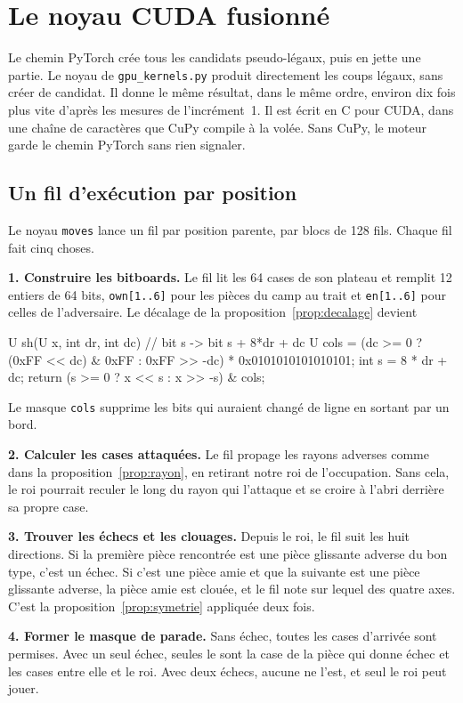 \documentclass[11pt,a4paper]{article}
\newcommand{\code}[1]{\texttt{#1}}
\theoremstyle{plain}
\begin{document}
\section{Le noyau CUDA fusionné}

Le chemin PyTorch crée tous les candidats pseudo-légaux, puis en jette une partie. Le noyau de
\code{gpu\_kernels.py} produit directement les coups légaux, sans créer de candidat. Il donne le
même résultat, dans le même ordre, environ dix fois plus vite d'après les mesures de
l'incrément~1. Il est écrit en C pour CUDA, dans une chaîne de caractères que CuPy compile à la
volée. Sans CuPy, le moteur garde le chemin PyTorch sans rien signaler.

\subsection{Un fil d'exécution par position}
Le noyau \code{moves} lance un fil par position parente, par blocs de 128 fils. Chaque fil fait
cinq choses.

\textbf{1. Construire les bitboards.} Le fil lit les 64 cases de son plateau et remplit 12
entiers de 64 bits, \code{own[1..6]} pour les pièces du camp au trait et \code{en[1..6]} pour
celles de l'adversaire. Le décalage de la proposition~\ref{prop:decalage} devient
\begin{python}
U sh(U x, int dr, int dc) {     // bit s -> bit s + 8*dr + dc
    U cols = (dc >= 0 ? (0xFF << dc) & 0xFF : 0xFF >> -dc) * 0x0101010101010101;
    int s = 8 * dr + dc;
    return (s >= 0 ? x << s : x >> -s) & cols;
}
\end{python}
Le masque \code{cols} supprime les bits qui auraient changé de ligne en sortant par un bord.

\textbf{2. Calculer les cases attaquées.} Le fil propage les rayons adverses comme dans la
proposition~\ref{prop:rayon}, en retirant notre roi de l'occupation. Sans cela, le roi pourrait
reculer le long du rayon qui l'attaque et se croire à l'abri derrière sa propre case.

\textbf{3. Trouver les échecs et les clouages.} Depuis le roi, le fil suit les huit directions.
Si la première pièce rencontrée est une pièce glissante adverse du bon type, c'est un échec. Si
c'est une pièce amie et que la suivante est une pièce glissante adverse, la pièce amie est
clouée, et le fil note sur lequel des quatre axes. C'est la proposition~\ref{prop:symetrie}
appliquée deux fois.

\textbf{4. Former le masque de parade.} Sans échec, toutes les cases d'arrivée sont permises.
Avec un seul échec, seules le sont la case de la pièce qui donne échec et les cases entre elle et
le roi. Avec deux échecs, aucune ne l'est, et seul le roi peut jouer.
\end{document}
